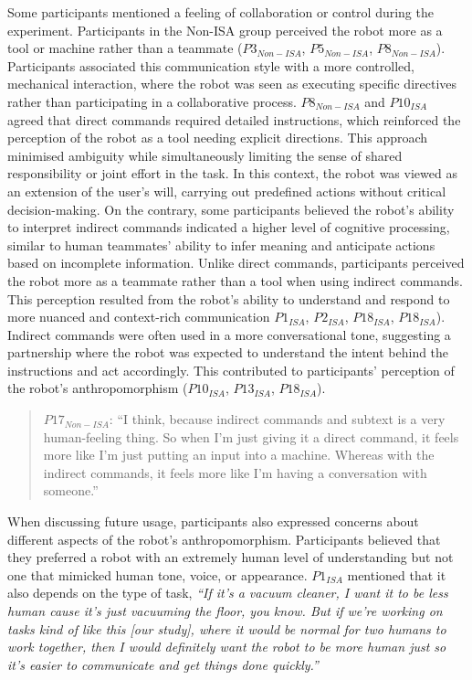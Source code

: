 Some participants mentioned a feeling of collaboration or control during the experiment. Participants in the Non-ISA group perceived the robot more as a tool or machine rather than a teammate ($P3_{Non-ISA}$, $P5_{Non-ISA}$, $P8_{Non-ISA}$). Participants associated this communication style with a more controlled, mechanical interaction, where the robot was seen as executing specific directives rather than participating in a collaborative process. $P8_{Non-ISA}$ and $P10_{ISA}$ agreed that direct commands required detailed instructions, which reinforced the perception of the robot as a tool needing explicit directions. This approach minimised ambiguity while simultaneously limiting the sense of shared responsibility or joint effort in the task. In this context, the robot was viewed as an extension of the user's will, carrying out predefined actions without critical decision-making. On the contrary, some participants believed the robot's ability to interpret indirect commands indicated a higher level of cognitive processing, similar to human teammates' ability to infer meaning and anticipate actions based on incomplete information. Unlike direct commands, participants perceived the robot more as a teammate rather than a tool when using indirect commands. This perception resulted from the robot's ability to understand and respond to more nuanced and context-rich communication $P1_{ISA}$, $P2_{ISA}$, $P18_{ISA}$, $P18_{ISA}$). Indirect commands were often used in a more conversational tone, suggesting a partnership where the robot was expected to understand the intent behind the instructions and act accordingly. This contributed to participants' perception of the robot's anthropomorphism ($P10_{ISA}$, $P13_{ISA}$, $P18_{ISA}$).

\begin{quote}
    $P17_{Non-ISA}$: ``I think, because indirect commands and subtext is a very human-feeling thing. So when I'm just giving it a direct command, it feels more like I'm just putting an input into a machine. Whereas with the indirect commands, it feels more like I'm having a conversation with someone.''
\end{quote}

When discussing future usage, participants also expressed concerns about different aspects of the robot's anthropomorphism. Participants believed that they preferred a robot with an extremely human level of understanding but not one that mimicked human tone, voice, or appearance. $P1_{ISA}$ mentioned that it also depends on the type of task, \textit{``If it's a vacuum cleaner, I want it to be less human cause it's just vacuuming the floor, you know. But if we're working on tasks kind of like this [our study], where it would be normal for two humans to work together, then I would definitely want the robot to be more human just so it's easier to communicate and get things done quickly.''}

